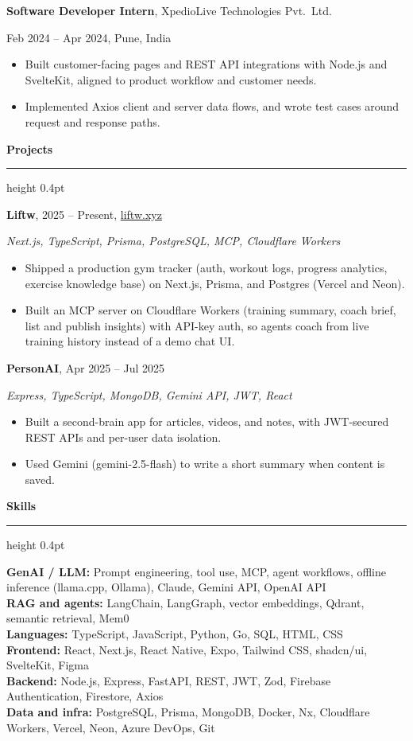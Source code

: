 \documentclass[letterpaper,10pt]{article}
\newcommand{\rsection}[1]{%
  \vspace{6pt}%
  {\bfseries #1}\par
  \vspace{1pt}%
  \hrule height 0.4pt
  \vspace{3pt}%
}
\newcommand{\role}[4]{%
  \textbf{#1}, #3\par
  #2, #4\par
  \vspace{2pt}%
}
\begin{document}
\vspace{4pt}
\role{Software Developer Intern}{Feb 2024 -- Apr 2024}{XpedioLive Technologies Pvt.\ Ltd.}{Pune, India}
\begin{itemize}
  \item Built customer-facing pages and REST API integrations with Node.js and SvelteKit, aligned to product workflow and customer needs.
  \item Implemented Axios client and server data flows, and wrote test cases around request and response paths.
\end{itemize}

\rsection{Projects}

\textbf{Liftw}, 2025 -- Present, \href{https://liftw.xyz}{liftw.xyz}\par
\textit{Next.js, TypeScript, Prisma, PostgreSQL, MCP, Cloudflare Workers}
\begin{itemize}
  \item Shipped a production gym tracker (auth, workout logs, progress analytics, exercise knowledge base) on Next.js, Prisma, and Postgres (Vercel and Neon).
  \item Built an MCP server on Cloudflare Workers (training summary, coach brief, list and publish insights) with API-key auth, so agents coach from live training history instead of a demo chat UI.
\end{itemize}

\vspace{3pt}
\textbf{PersonAI}, Apr 2025 -- Jul 2025\par
\textit{Express, TypeScript, MongoDB, Gemini API, JWT, React}
\begin{itemize}
  \item Built a second-brain app for articles, videos, and notes, with JWT-secured REST APIs and per-user data isolation.
  \item Used Gemini (gemini-2.5-flash) to write a short summary when content is saved.
\end{itemize}

\rsection{Skills}

\textbf{GenAI / LLM:} Prompt engineering, tool use, MCP, agent workflows, offline inference (llama.cpp, Ollama), Claude, Gemini API, OpenAI API\\
\textbf{RAG and agents:} LangChain, LangGraph, vector embeddings, Qdrant, semantic retrieval, Mem0\\
\textbf{Languages:} TypeScript, JavaScript, Python, Go, SQL, HTML, CSS\\
\textbf{Frontend:} React, Next.js, React Native, Expo, Tailwind CSS, shadcn/ui, SvelteKit, Figma\\
\textbf{Backend:} Node.js, Express, FastAPI, REST, JWT, Zod, Firebase Authentication, Firestore, Axios\\
\textbf{Data and infra:} PostgreSQL, Prisma, MongoDB, Docker, Nx, Cloudflare Workers, Vercel, Neon, Azure DevOps, Git
\end{document}
